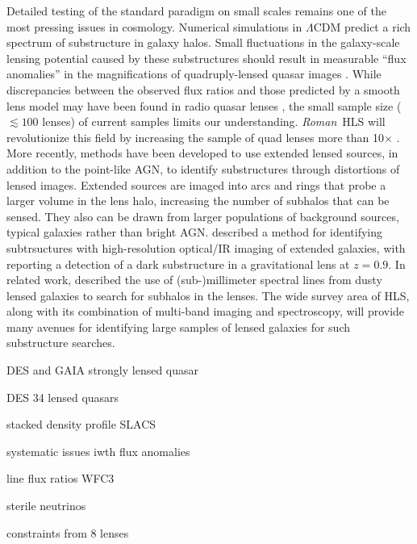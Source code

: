 \documentclass[11pt]{article}
\newcommand{\RST}{\emph{Roman}~}
\begin{document}
Detailed testing of the standard paradigm on small scales remains one of the most pressing issues
in cosmology. Numerical simulations in $\Lambda$CDM predict a rich spectrum of substructure in galaxy
halos. Small fluctuations in the galaxy-scale lensing potential caused by these substructures
should result in measurable “flux anomalies” in the magnifications of quadruply-lensed quasar
images \citep{metcalf2001a}. While discrepancies between the observed flux ratios and
those predicted by a smooth lens model may have been found in radio quasar lenses \citep{mao1998a,dalal2002a,metcalf2002a}, the small sample size ($\lesssim100$
lenses) of current samples limits our understanding. \RST HLS will revolutionize this field
by increasing the sample of quad lenses more than 10$\times$ \citep{oguri2010a}.
More recently, methods have been developed to use extended lensed sources, in addition to the
point-like AGN, to identify substructures through distortions of lensed images. Extended sources
are imaged into arcs and rings that probe a larger volume in the lens halo, increasing the number
of subhalos that can be sensed. They also can be drawn from larger populations of background
sources, typical galaxies rather than bright AGN. \cite[Vegetti \& Koopman (2009)][]{vegetti2009a} described a
method for identifying subtrsuctures with high-resolution optical/IR imaging of extended
galaxies, with \cite[Vegetti et al. (2012)][]{vegetti2012a} reporting a detection of a dark substructure in a gravitational
lens at $z=0.9$. 
In related work, \cite[Hezaveh et al. (2013, 2016a)][]{hezaveh2013a,hezaveh2016a} described the use of (sub-)millimeter
spectral lines from dusty lensed galaxies to search for subhalos in the lenses. The wide survey
area of HLS, along with its combination of multi-band imaging and spectroscopy, will provide
many avenues for identifying large samples of lensed galaxies for such substructure searches.


DES and GAIA strongly lensed quasar \citep{agnello2018a}

DES 34 lensed quasars \citep{anguita2018a}

stacked density profile SLACS \citep{gavazzi2007a}

systematic issues iwth flux anomalies \citep{hsueh2017a}

line flux ratios WFC3 \citep{nierenberg2017a}

sterile neutrinos \citep{despali2020a}

constraints from 8 lenses \citep{gilman2020a}
\end{document}
